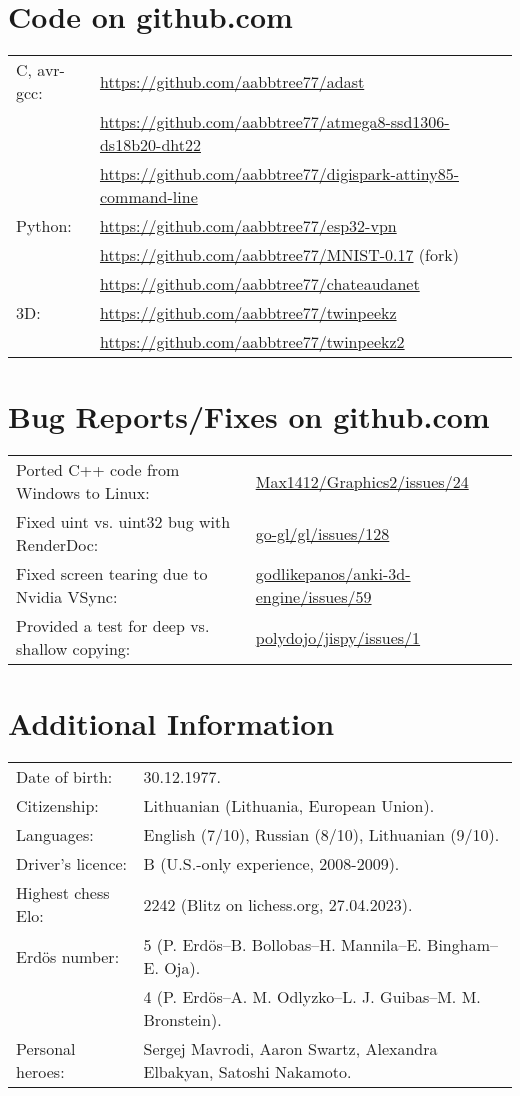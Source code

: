 \documentclass[a4paper,11pt]{article}
\begin{document}
\section{Code on github.com}
\begin{tabular}{ll}
C, avr-gcc: & \url{https://github.com/aabbtree77/adast}\\
& \url{https://github.com/aabbtree77/atmega8-ssd1306-ds18b20-dht22}\\
& \url{https://github.com/aabbtree77/digispark-attiny85-command-line}\\
Python: & \url{https://github.com/aabbtree77/esp32-vpn}\\
& \url{https://github.com/aabbtree77/MNIST-0.17} (fork)\\
& \url{https://github.com/aabbtree77/chateaudanet}\\
3D: & \url{https://github.com/aabbtree77/twinpeekz}\\
    & \url{https://github.com/aabbtree77/twinpeekz2}
\end{tabular}
%
\section{Bug Reports/Fixes on github.com}
\begin{tabular}{ll}
Ported C++ code from Windows to Linux: & \url{Max1412/Graphics2/issues/24}\\
Fixed uint vs. uint32 bug with RenderDoc: & \url{go-gl/gl/issues/128}\\
Fixed screen tearing due to Nvidia VSync: & \url{godlikepanos/anki-3d-engine/issues/59}\\
Provided a test for deep vs. shallow copying: & \url{polydojo/jispy/issues/1}
\end{tabular}
%
\section{Additional Information}
%
\begin{tabular}{ll}
		Date of birth: & 30.12.1977.\\
		Citizenship: & Lithuanian (Lithuania, European Union).\\
        Languages: & English (7/10), Russian (8/10), Lithuanian (9/10).\\
        Driver's licence:& B (U.S.-only experience, 2008-2009).\\
        Highest chess Elo:& 2242 (Blitz on lichess.org, 27.04.2023).\\
        Erd\"{o}s number: & 5 (P. Erd\"{o}s--B. Bollobas--H. Mannila--E. Bingham--E. Oja).\\
                          & 4 (P. Erd\"{o}s--A. M. Odlyzko--L. J. Guibas--M. M. Bronstein).\\
    Personal heroes: & Sergej Mavrodi, Aaron Swartz, Alexandra Elbakyan, Satoshi Nakamoto.
\end{tabular}
%

\end{document}
